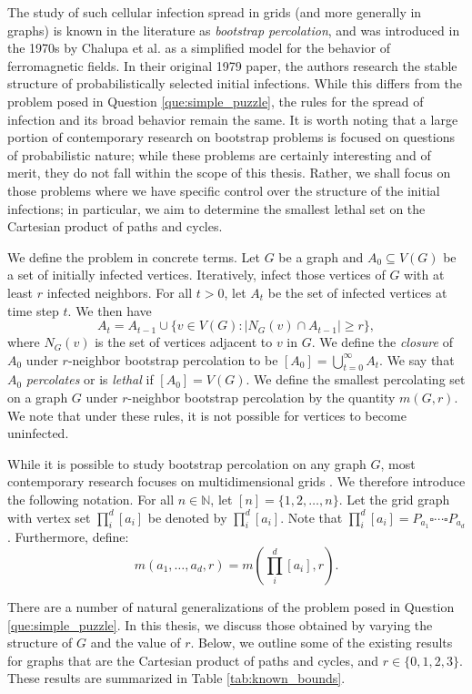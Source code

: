 The study of such cellular infection spread in grids (and more generally in graphs) is known in the literature as \emph{bootstrap percolation}, and was introduced in the 1970s by Chalupa et al. \cite{chalupa:1979} as a simplified model for the behavior of ferromagnetic fields. In their original 1979 paper, the authors research the stable structure of probabilistically selected initial infections. While this differs from the problem posed in Question \ref{que:simple_puzzle}, the rules for the spread of infection and its broad behavior remain the same. It is worth noting that a large portion of contemporary research on bootstrap problems is focused on questions of probabilistic nature; while these problems are certainly interesting and of merit, they do not fall within the scope of this thesis. Rather, we shall focus on those problems where we have specific control over the structure of the initial infections; in particular, we aim to determine the smallest lethal set on the Cartesian product of paths and cycles. 

We define the problem in concrete terms. Let $G$ be a graph and $A_0 \subseteq V(G)$ be a set of initially infected vertices. Iteratively, infect those vertices of $G$ with at least $r$ infected neighbors. For all $t > 0$, let $A_t$ be the set of infected vertices at time step $t$. We then have
$$A_t = A_{t-1} \cup \{v \in V(G) : |N_G(v) \cap A_{t-1}| \geq r\},$$
where $N_G(v)$ is the set of vertices adjacent to $v$ in $G$. We define the \emph{closure} of $A_0$ under $r$-neighbor bootstrap percolation to be $[A_0] = \bigcup_{t=0}^{\infty} A_t$. We say that $A_0$ \emph{percolates} or is \emph{lethal} if $[A_0] = V(G)$. We define the smallest percolating set on a graph $G$ under $r$-neighbor bootstrap percolation by the quantity $m(G,r)$. We note that under these rules, it is not possible for vertices to become uninfected.

While it is possible to study bootstrap percolation on any graph $G$, most contemporary research focuses on multidimensional grids \cite{something}. We therefore introduce the following notation. For all $n \in \mathbb{N}$, let $[n] = \{1, 2, \dots, n\}$. Let the grid graph with vertex set $\prod_i^d [a_i]$ be denoted by $\prod_i^d [a_i]$. Note that $\prod_i^d [a_i] = P_{a_1} \square \cdots \square P_{a_d}$. Furthermore, define:
$$m(a_1, \dots, a_d, r) = m(\prod_i^d [a_i], r).$$

There are a number of natural generalizations of the problem posed in Question \ref{que:simple_puzzle}. In this thesis, we discuss those obtained by varying the structure of $G$ and the value of $r$. Below, we outline some of the existing results for graphs that are the Cartesian product of paths and cycles, and $r \in \{0, 1, 2, 3\}$. These results are summarized in Table \ref{tab:known_bounds}.

